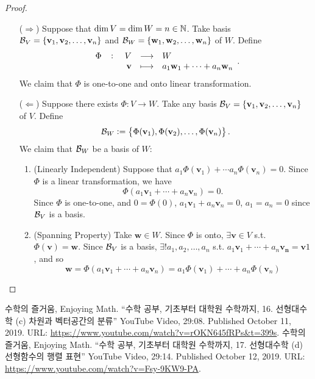\documentclass[11pt,openany]{article}
\renewcommand{\vec}[1]{\mathbf{#1}}
\begin{document}
\begin{proof}
\begin{itemize}
	\item[($\Rightarrow$)] Suppose that $\dim V=\dim W=n\in\mathbb{N}$. Take basis $\basis_V=\set{\vec{v}_1,\vec{v}_2,\dots,\vec{v}_n}$ and $\basis_W=\set{\vec{w}_1,\vec{w}_2,\dots,\vec{w}_n}$ of $W$. Define \[
	\fullfunction{\Phi}{V}{W}{\vec{v}}{a_1\vec{w}_1+\cdots+a_n\vec{w}_n}.
	\] We claim that $\Phi$ is one-to-one and onto linear transformation.
	\item[($\Leftarrow$)] Suppose there exists $\Phi:V\to W$. Take any basis $\basis_V=\set{\vec{v}_1,\vec{v}_2,\dots,\vec{v}_n}$ of $V$. Define \[
	\basis_W:=\set{\Phi(\vec{v}_1),\Phi(\vec{v}_2),\dots,\Phi(\vec{v}_n)}.
	\]  We claim that $\mathcal{B}_W$ be a basis of $W$: \begin{enumerate}[]
		\item (Linearly Independent) Suppose that $a_1\Phi(\vec{v}_1)+\cdots a_n\Phi(\vec{v}_n)=0$. Since $\Phi$ is a linear transformation, we have \[
		\Phi(a_1\vec{v}_1+\cdots+a_n\vec{v}_n)=0.
		\] Since $\Phi$ is one-to-one, and $0=\Phi(0)$, $a_1\vec{v}_1+a_n\vec{v}_n=0$, $a_1=a_n=0$ since $\mathcal{B}_V$ is a basis.
		\item (Spanning Property) Take $\vec{w}\in W$. Since $\Phi$ is onto, $\exists \vec{v}\in V$ s.t. $\Phi(\vec{v})=\vec{w}$. Since $\mathcal{B}_V$ is a basis, $\exists!a_1,a_2,\dots,a_n$ s.t. $a_1\vec{v}_1+\cdots+a_n\vec{v_n}=\vec{v}1$, and so \[
		\vec{w}=\Phi(a_1\vec{v}_1+\cdots+a_n\vec{v}_n)=a_1\Phi(\vec{v}_1)+\cdots+a_n\Phi(\vec{v}_n)
		\]
	\end{enumerate}
\end{itemize}
\end{proof}

\vfill
\begin{thebibliography}{9}
	수학의 즐거움, Enjoying Math. ``수학 공부, 기초부터 대학원 수학까지, 16. 선형대수학 (c) 차원과 벡터공간의 분류'' YouTube Video, 29:08. Published 
	October 11, 2019. URL: \url{https://www.youtube.com/watch?v=rOKN645fRPs&t=399s}.
	수학의 즐거움, Enjoying Math. ``수학 공부, 기초부터 대학원 수학까지, 17. 선형대수학 (d) 선형함수의 행렬 표현'' YouTube Video, 29:14. Published 
	October 12, 2019. URL: \url{https://www.youtube.com/watch?v=Fsy-9KW9-PA}.
\end{thebibliography}
\end{document}
